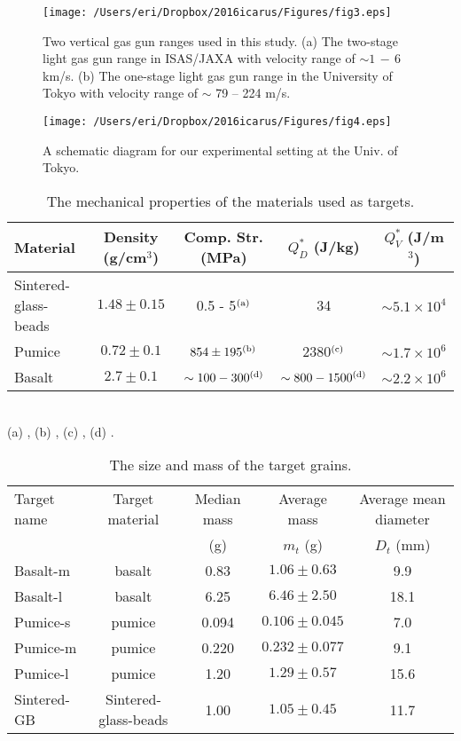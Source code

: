 \documentclass[3p,authoryear]{elsarticle}
\begin{document}
\begin{figure*}[tbhp]
	\centering
	\texttt{[image: /Users/eri/Dropbox/2016icarus/Figures/fig3.eps]}
	\caption{Two vertical gas gun ranges used in this study. (a) The two-stage light gas gun range in ISAS/JAXA with velocity range of $\sim 1\,-\,6$ km/s. (b) The one-stage light gas gun range in the University of Tokyo with velocity range of $\sim $ 79 -- 224 m/s.}
	\label{gun_range}
	\centering
\end{figure*}
\begin{figure}[htbp]
	\begin{center}
	\texttt{[image: /Users/eri/Dropbox/2016icarus/Figures/fig4.eps]}
	\caption{A schematic diagram for our experimental setting at the Univ. of Tokyo. }
	\label{schematic-exp}
	\end{center}
\end{figure}
\begin{table*}
	\caption{The mechanical properties of the materials used as targets.}
	\label{material}
	\begin{center}
	\small
	\begin{tabular}{lcccc}\hline
	Material & Density (g/cm$^3$) & Comp. Str. (MPa) & $Q_D^*$ (J/kg) & $Q_V^*$ (J/m$^3$) \\ \hline
	Sintered-glass-beads & $1.48\pm0.15$ & 0.5 - 5$^{\rm (a)}$ & 34 & $\sim 5.1\times 10^4$\\
	Pumice & $0.72 \pm 0.1$ & $854\pm 195^{\rm (b)}$& 2380$^{\rm (c)}$& $\sim 1.7\times 10^6$\\
	Basalt &$2.7\pm0.1$ & $\sim 100-300^{\rm (d)}$&$\sim 800 -1500^{\rm (d)}$& $\sim 2.2\times 10^6$\\
	 \hline
	\end{tabular}\\
	(a) \citet{setoh2010}, (b) \citet{patmore2014}, (c) \citet{flynn2015}, (d) \citet{takagi1984,HH1999}.
	\end{center}
\end{table*}
%
\begin{table*}[btp]
	\caption{The size and mass of the target grains.}
	\centering
	\small
	\begin{tabular}{lcccc} \hline
	Target name &Target material & Median mass & Average mass& Average mean diameter\\
	& &(g) &$m_t$ (g)& $D_t$ (mm) \\ \hline
	Basalt-m & basalt & 0.83 & $1.06\pm 0.63$ & 9.9\\
	Basalt-l & basalt & 6.25 & $6.46 \pm 2.50$ & 18.1\\
	Pumice-s& pumice & 0.094 & $0.106\pm0.045$ & 7.0\\
	Pumice-m & pumice & 0.220 & $0.232\pm0.077$ &9.1 \\
	Pumice-l & pumice & 1.20 & $1.29\pm 0.57$ & 15.6\\
	Sintered-GB & Sintered-glass-beads & 1.00 & $1.05 \pm 0.45$ & 11.7\\
	\hline
	\end{tabular}
	\centering
\end{table*}
\end{document}
